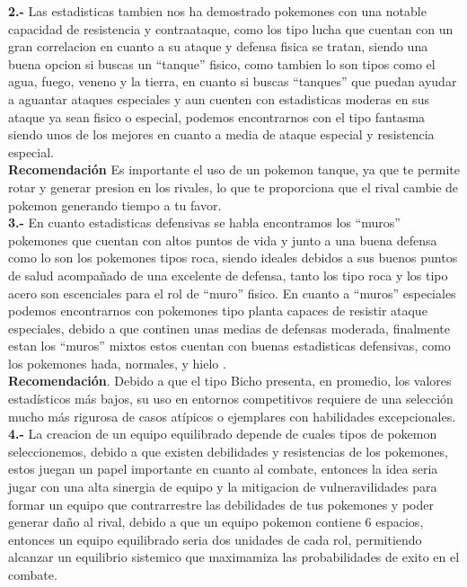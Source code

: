 \documentclass[oneside,11pt]{Latex/Classes/PhDthesisPSnPDF}
\begin{document}
\textbf{2.-} Las estadisticas tambien nos ha demostrado pokemones con
una notable capacidad de resistencia y contraataque, como los tipo lucha
que cuentan con un gran correlacion en cuanto a su ataque y defensa
fisica se tratan, siendo una buena opcion si buscas un ``tanque''
fisico, como tambien lo son tipos como el agua, fuego, veneno y la
tierra, en cuanto si buscas ``tanques'' que puedan ayudar a aguantar
ataques especiales y aun cuenten con estadisticas moderas en sus ataque
ya sean fisico o especial, podemos encontrarnos con el tipo fantasma
siendo unos de los mejores en cuanto a media de ataque especial y
resistencia especial.\\

\textbf{Recomendación} Es importante el uso de un pokemon tanque, ya que
te permite rotar y generar presion en los rivales, lo que te proporciona
que el rival cambie de pokemon generando tiempo a tu favor.\\

\textbf{3.-} En cuanto estadisticas defensivas se habla encontramos los
``muros'' pokemones que cuentan con altos puntos de vida y junto a una
buena defensa como lo son los pokemones tipos roca, siendo ideales
debidos a sus buenos puntos de salud acompañado de una excelente de
defensa, tanto los tipo roca y los tipo acero son escenciales para el
rol de ``muro'' fisico. En cuanto a ``muros'' especiales podemos
encontrarnos con pokemones tipo planta capaces de resistir ataque
especiales, debido a que continen unas medias de defensas moderada,
finalmente estan los ``muros'' mixtos estos cuentan con buenas
estadisticas defensivas, como los pokemones hada, normales, y hielo .\\

\textbf{Recomendación}. Debido a que el tipo Bicho presenta, en
promedio, los valores estadísticos más bajos, su uso en entornos
competitivos requiere de una selección mucho más rigurosa de casos
atípicos o ejemplares con habilidades excepcionales.\\

\textbf{4.-} La creacion de un equipo equilibrado depende de cuales
tipos de pokemon seleccionemos, debido a que existen debilidades y
resistencias de los pokemones, estos juegan un papel importante en
cuanto al combate, entonces la idea seria jugar con una alta sinergia de
equipo y la mitigacion de vulneravilidades para formar un equipo que
contrarrestre las debilidades de tus pokemones y poder generar daño al
rival, debido a que un equipo pokemon contiene 6 espacios, entonces un
equipo equilibrado seria dos unidades de cada rol, permitiendo alcanzar
un equilibrio sistemico que maximamiza las probabilidades de exito en el
combate.\\
\end{document}
